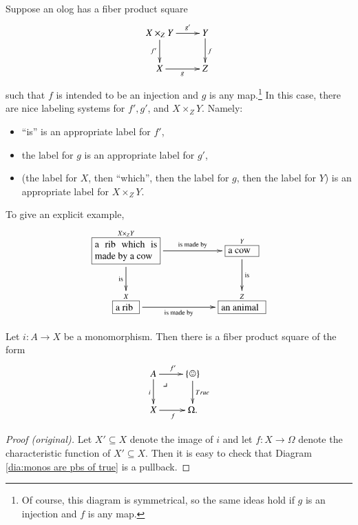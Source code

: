 \documentclass[a4paper]{book}
\makeatletter
\def\tn{\textnormal}
\def\singleton{\{\smiley\}}
\def\to{\rightarrow}
\def\taking{\colon}
\def\ss{\subseteq}
\newcommand{\LA}[2]{\ar[#1]^-{\tn {#2}}}
\newcommand{\LAL}[2]{\ar[#1]_-{\tn {#2}}}
\newcommand{\obox}[3]{\stackrel{#1}{\fbox{\parbox{#2}{#3}}}}
\def\ullimit{\ar@{}[rd]|(.3)*+{\lrcorner}}
\theoremstyle{myth}
\newtheorem{corollaryENG}[envENG]{\begin{english}Corollary\end{english}}
\newtheorem{exampleENG}[envENG]{\begin{english}Example\end{english}}
\newenvironment{proofENG}{\begin{proof}[Proof (original)]}{\end{proof}}
\newtheorem{corollaryRUS}[envRUS]{\begin{russian}Следствие\end{russian}}
\newtheorem{exampleRUS}[envRUS]{\begin{russian}Пример\end{russian}}
\makeatother
\begin{document}
\begin{english}
\begin{exampleENG}\label{exc:olog pullbacks}
Suppose an olog has a fiber product square
$$\xymatrix{X\times_ZY\ar[r]^-{g'}\ar[d]_{f'}&Y\ar[d]^f\\X\ar[r]_g&Z}$$ such that $f$ is intended to be an injection and $g$ is any map.\footnote{Of course, this diagram is symmetrical, so the same ideas hold if $g$ is an injection and $f$ is any map.} 
In this case, there are nice labeling systems for $f', g'$, and $X\times_ZY$. Namely:
\begin{itemize}
\item “is” is an appropriate label for $f'$, 
\item the label for $g$ is an appropriate label for $g'$,
\item (the label for $X$, then “which”, then the label for $g$, then the label for $Y$) is an appropriate label for $X\times_ZY$.
\end{itemize}

To give an explicit example, 
$$\xymatrix{
\obox{X\times_ZY}{.9in}{a rib which is made by a cow}\LA{rr}{is made by}\LAL{d}{is}&&\obox{Y}{.4in}{a cow}\LA{d}{is}\\
\obox{X}{.3in}{a rib}\LAL{rr}{is made by}&&\obox{Z}{.6in}{an animal}
}
$$
\end{exampleENG}

\begin{exampleRUS}\label{exc:olog pullbacks}
\begin{russian} \end{russian}
\end{exampleRUS}

\begin{corollaryENG}\label{cor:monos are pullbacks of true}
Let $i\taking A\to X$ be a monomorphism. Then there is a fiber product square of the form 
\begin{align}\label{dia:monos are pbs of true}
\xymatrix{A\ar[r]^{f'}\ar[d]_i\ullimit&\singleton\ar[d]^{True}\\X\ar[r]_f&\Omega.}
\end{align}
\end{corollaryENG}

\begin{corollaryRUS}\label{cor:monos are pullbacks of true}
\begin{russian} \end{russian}
\end{corollaryRUS}

\begin{proofENG}
Let $X'\ss X$ denote the image of $i$ and let $f\taking X\to\Omega$ denote the characteristic function of $X'\ss X$. Then it is easy to check that Diagram \ref{dia:monos are pbs of true} is a pullback.
\end{proofENG}


\end{english}
\end{document}
